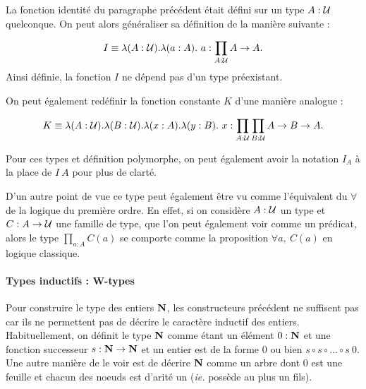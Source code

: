 \documentclass[../../rapport.tex]{subfiles}
\begin{document}
  \begin{example}
    La fonction identité du paragraphe précédent était défini sur un type $A : \mathcal U$ quelconque.
    On peut alors généraliser sa définition de la manière suivante :

    $$I \equiv \lambda (A : \mathcal U). \lambda (a : A).\ a : \prod_{A : \mathcal U}{A \rightarrow A}.$$
    Ainsi définie, la fonction $I$ ne dépend pas d'un type préexistant.

    On peut également redéfinir la fonction constante $K$ d'une manière analogue :

    $$K \equiv \lambda (A : \mathcal U). \lambda (B : \mathcal U). \lambda (x : A). \lambda (y : B).\ x :
      \prod_{A : \mathcal U}\prod_{B : \mathcal U}{A \rightarrow B \rightarrow A}.$$

    Pour ces types et définition polymorphe, on peut également avoir la notation $I_A$ à la place de $I\ A$
    pour plus de clarté.
  \end{example}

  D'un autre point de vue ce type peut également être vu comme l'équivalent du $\forall$ de la logique
  du première ordre.
  En effet, si on considère $A : \mathcal U$ un type et $C : A \rightarrow \mathcal U$ une famille de type,
  que l'on peut également voir comme un prédicat, alors le type $\prod_{a : A}{C(a)}$ se comporte comme
  la proposition $\forall a,\ C(a)$ en logique classique.

  \paragraph{Types inductifs : W-types}

  Pour construire le type des entiers $\mathbf N$, les constructeurs précédent ne suffisent pas car ils ne permettent
  pas de décrire le caractère inductif des entiers.
  Habituellement, on définit le type $\mathbf N$ comme étant un élément $0 : \mathbf N$ et une fonction successeur
  $s : \mathbf N \rightarrow \mathbf N$ et un entier est de la forme $0$ ou bien $s\circ s \circ \hdots \circ s\ 0$.
  Une autre manière de le voir est de décrire $\mathbf N$ comme un arbre dont $0$ est une feuille et
  chacun des noeuds est d'arité un (\textit{ie.} possède au plus un fils).

  \begin{figure}[ht]
    \centering
  \end{figure}
\end{document}
